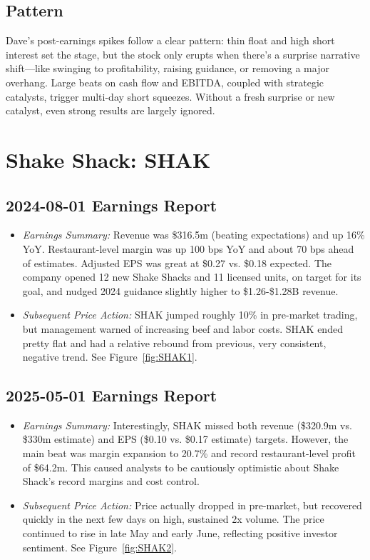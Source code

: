 \documentclass[11pt]{article}
\begin{document}
    \subsection{Pattern}
        Dave’s post-earnings spikes follow a clear pattern: thin float and high short interest set the stage, but the stock only erupts when there's a surprise narrative shift—like swinging to profitability, raising guidance, or removing a major overhang. Large beats on cash flow and EBITDA, coupled with strategic catalysts, trigger multi-day short squeezes. Without a fresh surprise or new catalyst, even strong results are largely ignored.
\section{Shake Shack: SHAK}
    \subsection{2024-08-01 Earnings Report}
        \begin{itemize}
            \item \textit{Earnings Summary:} Revenue was \$316.5m (beating expectations) and up 16\% YoY. Restaurant-level margin was up 100 bps YoY and about 70 bps ahead of estimates. Adjusted EPS was great at \$0.27 vs. \$0.18 expected. The company opened 12 new Shake Shacks and 11 licensed units, on target for its goal, and nudged 2024 guidance slightly higher to \$1.26-\$1.28B revenue.
            \item \textit{Subsequent Price Action:} SHAK jumped roughly 10\% in pre-market trading, but management warned of increasing beef and labor costs. SHAK ended pretty flat and had a relative rebound from previous, very consistent, negative trend. See Figure~\ref{fig:SHAK1}.
        \end{itemize}
    \subsection{2025-05-01 Earnings Report}
        \begin{itemize}
            \item \textit{Earnings Summary:} Interestingly, SHAK missed both revenue (\$320.9m vs. \$330m estimate) and EPS (\$0.10 vs. \$0.17 estimate) targets. However, the main beat was margin expansion to 20.7\% and record restaurant-level profit of \$64.2m. This caused analysts to be cautiously optimistic about Shake Shack's record margins and cost control. 
            \item \textit{Subsequent Price Action:} Price actually dropped in pre-market, but recovered quickly in the next few days on high, sustained 2x volume. The price continued to rise in late May and early June, reflecting positive investor sentiment. See Figure~\ref{fig:SHAK2}.
        \end{itemize}
\end{document}
